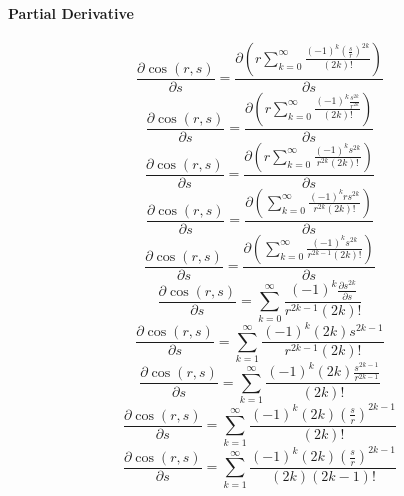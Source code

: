 \documentclass[a4paper,12pt]{report}
\begin{document}
\paragraph{Partial Derivative}
\begin{equation}
\frac{\partial \cos(r,s)}{\partial s} = \frac{\partial \left(r \sum \limits_{k=0}^{\infty} \frac{(-1)^k \left(\frac{s}{r}\right)^{2k}}{(2k)!}\right)}{\partial s}
\end{equation}
\begin{equation}
\frac{\partial \cos(r,s)}{\partial s} = \frac{\partial \left(r \sum \limits_{k=0}^{\infty} \frac{(-1)^k \frac{s^{2k}}{r^{2k}}}{(2k)!}\right)}{\partial s}
\end{equation}
\begin{equation}
\frac{\partial \cos(r,s)}{\partial s} = \frac{\partial \left(r \sum \limits_{k=0}^{\infty} \frac{(-1)^k s^{2k}}{r^{2k} (2k)!}\right)}{\partial s}
\end{equation}
\begin{equation}
\frac{\partial \cos(r,s)}{\partial s} = \frac{\partial \left(\sum \limits_{k=0}^{\infty} \frac{(-1)^k rs^{2k}}{r^{2k} (2k)!}\right)}{\partial s}
\end{equation}
\begin{equation}
\frac{\partial \cos(r,s)}{\partial s} = \frac{\partial \left(\sum \limits_{k=0}^{\infty} \frac{(-1)^k s^{2k}}{r^{2k-1} (2k)!}\right)}{\partial s}
\end{equation}
\begin{equation}
\frac{\partial \cos(r,s)}{\partial s} = \sum \limits_{k=0}^{\infty} \frac{(-1)^k \frac{\partial s^{2k}}{\partial s}}{r^{2k-1} (2k)!}
\end{equation}
\begin{equation}
\frac{\partial \cos(r,s)}{\partial s} = \sum \limits_{k=1}^{\infty} \frac{(-1)^k (2k) s^{2k-1}}{r^{2k-1} (2k)!}
\end{equation}
\begin{equation}
\frac{\partial \cos(r,s)}{\partial s} = \sum \limits_{k=1}^{\infty} \frac{(-1)^k (2k) \frac{s^{2k-1}}{r^{2k-1}}}{(2k)!}
\end{equation}
\begin{equation}
\frac{\partial \cos(r,s)}{\partial s} = \sum \limits_{k=1}^{\infty} \frac{(-1)^k (2k) \left(\frac{s}{r}\right)^{2k-1}}{(2k)!}
\end{equation}
\begin{equation}
\frac{\partial \cos(r,s)}{\partial s} = \sum \limits_{k=1}^{\infty} \frac{(-1)^k (2k) \left(\frac{s}{r}\right)^{2k-1}}{(2k) (2k-1)!}
\end{equation}
\end{document}
